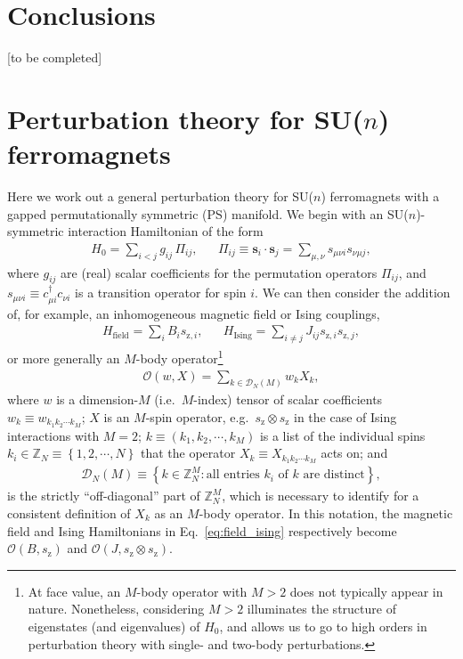 \documentclass[nofootinbib,twocolumn]{revtex4-2}
\renewcommand{\t}{\text} %
\newcommand{\p}[1]{\left(#1\right)} %
\renewcommand{\set}[1]{\left\{#1\right\}} %
\renewcommand{\v}{\bm} %
\renewcommand{\c}{\cdot} %
\newcommand{\1}{\mathds{1}}
\newcommand{\z}{\text{z}}
\newcommand{\ZZ}{\mathbb{Z}}
\newcommand{\D}{\mathcal{D}}
\renewcommand{\O}{\mathcal{O}}
\newcommand{\red}[1]{{\color{red} #1}}
\begin{document}
\section{Conclusions}

\red{[to be completed]}




\onecolumngrid
\appendix

\section{Perturbation theory for SU($n$) ferromagnets}
\label{sec:pert_theory}

Here we work out a general perturbation theory for SU($n$) ferromagnets with a gapped permutationally symmetric (PS) manifold.
We begin with an SU($n$)-symmetric interaction Hamiltonian of the form
\begin{align}
  H_0 = \sum_{i<j} g_{ij} \, \Pi_{ij},
  &&
  \Pi_{ij} \equiv \v s_i\c\v s_j
  = \sum_{\mu,\nu} s_{\mu\nu i} s_{\nu\mu j},
  \label{eq:H_0}
\end{align}
where $g_{ij}$ are (real) scalar coefficients for the permutation operators $\Pi_{ij}$, and $s_{\mu\nu i}\equiv c_{\mu i}^\dag c_{\nu i}$ is a transition operator for spin $i$.
We can then consider the addition of, for example, an inhomogeneous magnetic field or Ising couplings,
\begin{align}
  H_{\t{field}} = \sum_i B_i s_{\z,i},
  &&
  H_{\t{Ising}} = \sum_{i\ne j} J_{ij} s_{\z,i} s_{\z,j},
  \label{eq:field_ising}
\end{align}
or more generally an $M$-body operator\footnote{At face value, an $M$-body operator with $M>2$ does not typically appear in nature.
Nonetheless, considering $M>2$ illuminates the structure of eigenstates (and eigenvalues) of $H_0$, and allows us to go to high orders in perturbation theory with single- and two-body perturbations.}
\begin{align}
  \O\p{w,X} = \sum_{k\in\D_N\p{M}} w_k X_k,
\end{align}
where $w$ is a dimension-$M$ (i.e.~$M$-index) tensor of scalar
coefficients $w_k\equiv w_{k_1k_2\cdots k_M}$; $X$ is an $M$-spin
operator, e.g.~$s_\z\otimes s_\z$ in the case of Ising interactions
with $M=2$; $k\equiv\p{k_1,k_2,\cdots,k_M}$ is a list of the
individual spins $k_i\in\ZZ_N\equiv\set{1,2,\cdots,N}$ that the operator $X_k\equiv X_{k_1k_2\cdots k_M}$ acts on; and
\begin{align}
  \D_N\p{M} \equiv
  \set{ k \in \ZZ_N^M : \t{all entries $k_i$ of $k$ are distinct} },
\end{align}
is the strictly ``off-diagonal'' part of $\ZZ_N^M$, which is necessary to identify for a consistent definition of $X_k$ as an $M$-body operator.
In this notation, the magnetic field and Ising Hamiltonians in Eq.~\eqref{eq:field_ising} respectively become $\O\p{B,s_{\z}}$ and $\O\p{J,s_\z\otimes s_\z}$.
\end{document}
